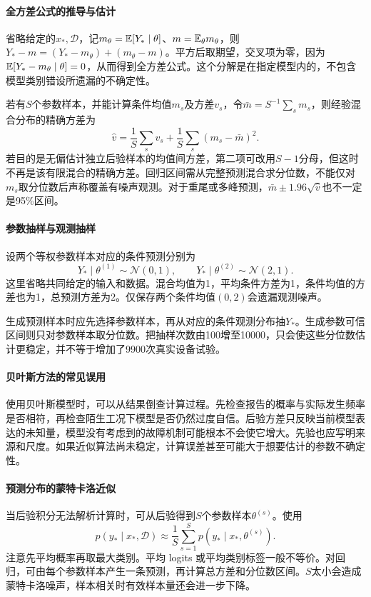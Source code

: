 \paragraph{全方差公式的推导与估计}
省略给定的$x_*,\mathcal D$，记$m_\theta=\mathbb{E}[Y_*\mid\theta]$、$m=\mathbb{E}_\theta m_\theta$，则$Y_*-m=(Y_*-m_\theta)+(m_\theta-m)$。平方后取期望，交叉项为零，因为$\mathbb{E}[Y_*-m_\theta\mid\theta]=0$，从而得到全方差公式。这个分解是在指定模型内的，不包含模型类别错设所遗漏的不确定性。

若有$S$个参数样本，并能计算条件均值$m_s$及方差$v_s$，令$\bar m=S^{-1}\sum_sm_s$，则经验混合分布的精确方差为
\begin{equation}
 \hat v=\frac1S\sum_sv_s+\frac1S\sum_s(m_s-\bar m)^2.
\end{equation}
若目的是无偏估计独立后验样本的均值间方差，第二项可改用$S-1$分母，但这时不再是该有限混合的精确方差。回归区间需从完整预测混合求分位数，不能仅对$m_s$取分位数后声称覆盖有噪声观测。对于重尾或多峰预测，$\bar m\pm1.96\sqrt{\hat v}$也不一定是95\%区间。

\paragraph{参数抽样与观测抽样}
设两个等权参数样本对应的条件预测分别为
\begin{equation*}
 Y_*\mid\theta^{(1)}\sim\mathcal N(0,1),\qquad
 Y_*\mid\theta^{(2)}\sim\mathcal N(2,1).
\end{equation*}
这里省略共同给定的输入和数据。混合均值为1，平均条件方差为1，条件均值的方差也为1，总预测方差为2。仅保存两个条件均值$(0,2)$会遗漏观测噪声。

生成预测样本时应先选择参数样本，再从对应的条件观测分布抽$Y_*$。生成参数可信区间则只对参数样本取分位数。把抽样次数由100增至10000，只会使这些分位数估计更稳定，并不等于增加了9900次真实设备试验。

\paragraph{贝叶斯方法的常见误用}
使用贝叶斯模型时，可以从结果倒查计算过程。先检查报告的概率与实际发生频率是否相符，再检查陌生工况下模型是否仍然过度自信。后验方差只反映当前模型表达的未知量，模型没有考虑到的故障机制可能根本不会使它增大。先验也应写明来源和尺度。如果近似算法尚未稳定，计算误差甚至可能大于想要估计的参数不确定性。

\paragraph{预测分布的蒙特卡洛近似}
当后验积分无法解析计算时，可从后验得到$S$个参数样本$\theta^{(s)}$。使用
\begin{equation}
 p(y_*\mid x_*,\mathcal D)\approx\frac1S\sum_{s=1}^{S}p(y_*\mid x_*,\theta^{(s)}).
\end{equation}
注意先平均概率再取最大类别。平均 logits 或平均类别标签一般不等价。对回归，可由每个参数样本产生一条预测，再计算总方差和分位数区间。$S$太小会造成蒙特卡洛噪声，样本相关时有效样本量还会进一步下降。

